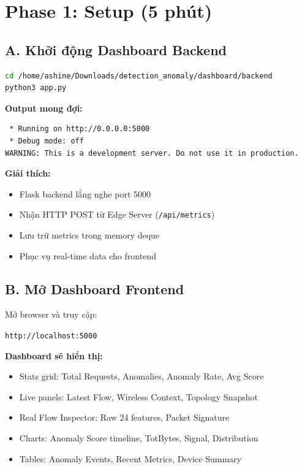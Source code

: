 \documentclass[12pt,a4paper]{article}
\begin{document}
\section{Phase 1: Setup (5 phút)}

\subsection{A. Khởi động Dashboard Backend}

\begin{lstlisting}[language=bash]
cd /home/ashine/Downloads/detection_anomaly/dashboard/backend
python3 app.py
\end{lstlisting}

\textbf{Output mong đợi:}
\begin{lstlisting}
 * Running on http://0.0.0.0:5000
 * Debug mode: off
WARNING: This is a development server. Do not use it in production.
\end{lstlisting}

\textbf{Giải thích:}
\begin{itemize}
    \item Flask backend lắng nghe port 5000
    \item Nhận HTTP POST từ Edge Server (\texttt{/api/metrics})
    \item Lưu trữ metrics trong memory deque
    \item Phục vụ real-time data cho frontend
\end{itemize}

\subsection{B. Mở Dashboard Frontend}

Mở browser và truy cập:
\begin{center}
\texttt{http://localhost:5000}
\end{center}

\textbf{Dashboard sẽ hiển thị:}
\begin{itemize}
    \item Stats grid: Total Requests, Anomalies, Anomaly Rate, Avg Score
    \item Live panels: Latest Flow, Wireless Context, Topology Snapshot
    \item Real Flow Inspector: Raw 24 features, Packet Signature
    \item Charts: Anomaly Score timeline, TotBytes, Signal, Distribution
    \item Tables: Anomaly Events, Recent Metrics, Device Summary
\end{itemize}
\end{document}
